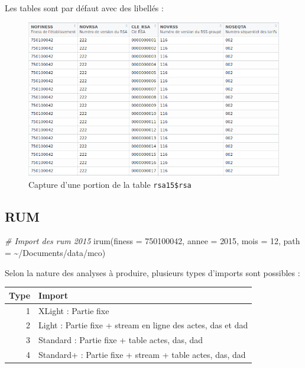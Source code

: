\documentclass[
]{book}
\newenvironment{Shaded}{\begin{snugshade}}{\end{snugshade}}
\newcommand{\AttributeTok}[1]{\textcolor[rgb]{0.77,0.63,0.00}{#1}}
\newcommand{\CommentTok}[1]{\textcolor[rgb]{0.56,0.35,0.01}{\textit{#1}}}
\newcommand{\DecValTok}[1]{\textcolor[rgb]{0.00,0.00,0.81}{#1}}
\newcommand{\FunctionTok}[1]{\textcolor[rgb]{0.00,0.00,0.00}{#1}}
\newcommand{\NormalTok}[1]{#1}
\newcommand{\StringTok}[1]{\textcolor[rgb]{0.31,0.60,0.02}{#1}}
\begin{document}
Les tables sont par défaut avec des libellés :

\begin{figure}
\centering
\includegraphics{images/rsa1.png}
\caption{Capture d'une portion de la table \texttt{rsa15\$rsa}}
\end{figure}

\hypertarget{rum}{%
\subsection{RUM}\label{rum}}

\begin{Shaded}
\begin{Highlighting}[]
\CommentTok{\# Import des rum 2015}
\FunctionTok{irum}\NormalTok{(}\AttributeTok{finess =} \DecValTok{750100042}\NormalTok{, }
     \AttributeTok{annee =} \DecValTok{2015}\NormalTok{, }
     \AttributeTok{mois =} \DecValTok{12}\NormalTok{, }
     \AttributeTok{path =} \StringTok{\textquotesingle{}\textasciitilde{}/Documents/data/mco\textquotesingle{}}\NormalTok{)}
\end{Highlighting}
\end{Shaded}

Selon la nature des analyses à produire, plusieurs types d'imports sont possibles :

\begin{longtable}[]{@{}rl@{}}
\toprule
Type & Import \\
\midrule
\endhead
1 & XLight : Partie fixe \\
2 & Light : Partie fixe + stream en ligne des actes, das et dad \\
3 & Standard : Partie fixe + table actes, das, dad \\
4 & Standard+ : Partie fixe + stream + table actes, das, dad \\
\bottomrule
\end{longtable}
\end{document}
